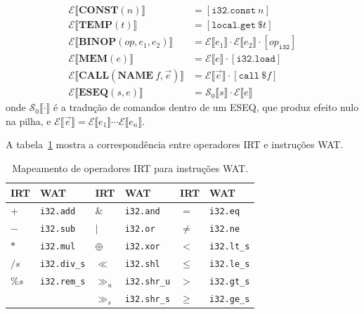 \begin{Definition}\label{def:trans-exprs}
  \begin{align*}
    \mathcal{E}\llbracket \mathbf{CONST}(n) \rrbracket
    &= [\mathtt{i32.const}\ n] \\
    \mathcal{E}\llbracket \mathbf{TEMP}(t) \rrbracket
    &= [\mathtt{local.get}\ \$t] \\
    \mathcal{E}\llbracket \mathbf{BINOP}(\mathit{op}, e_1, e_2) \rrbracket
    &= \mathcal{E}\llbracket e_1 \rrbracket \cdot
    \mathcal{E}\llbracket e_2 \rrbracket \cdot [\mathit{op}_{\mathtt{i32}}] \\
    \mathcal{E}\llbracket \mathbf{MEM}(e) \rrbracket
    &= \mathcal{E}\llbracket e \rrbracket \cdot [\mathtt{i32.load}] \\
    \mathcal{E}\llbracket \mathbf{CALL}(\mathbf{NAME}\ f, \vec{e}) \rrbracket
    &= \mathcal{E}\llbracket \vec{e} \rrbracket \cdot [\mathtt{call}\ \$f] \\
    \mathcal{E}\llbracket \mathbf{ESEQ}(s, e) \rrbracket
    &= \mathcal{S}_0\llbracket s \rrbracket \cdot
    \mathcal{E}\llbracket e \rrbracket
  \end{align*}
  onde $\mathcal{S}_0\llbracket \cdot \rrbracket$ é a tradução de comandos
  dentro de um ESEQ, que produz efeito nulo na pilha, e
  $\mathcal{E}\llbracket \vec{e} \rrbracket = \mathcal{E}\llbracket
  e_1 \rrbracket \cdots \mathcal{E}\llbracket e_n \rrbracket$.
\end{Definition}

A tabela~\ref{tab:binop} mostra a correspondência entre operadores IRT e
instruções WAT.

\begin{table}[htbp]
  \centering
  \begin{tabular}{ll|ll|ll}
    \hline
    \textbf{IRT} & \textbf{WAT} & \textbf{IRT} & \textbf{WAT} &
    \textbf{IRT} & \textbf{WAT} \\
    \hline
    $+$  & \texttt{i32.add}   & \&  & \texttt{i32.and}   & $=$  &
    \texttt{i32.eq}   \\
    $-$  & \texttt{i32.sub}   & $|$ & \texttt{i32.or}    & $\neq$ &
    \texttt{i32.ne} \\
    $*$  & \texttt{i32.mul}   & $\oplus$ & \texttt{i32.xor} & $<$ &
    \texttt{i32.lt\_s} \\
    $/s$ & \texttt{i32.div\_s}& $\ll$ & \texttt{i32.shl} & $\leq$ &
    \texttt{i32.le\_s} \\
    $\%s$& \texttt{i32.rem\_s}& $\gg_u$ & \texttt{i32.shr\_u} & $>$ &
    \texttt{i32.gt\_s} \\
    &                    & $\gg_s$ & \texttt{i32.shr\_s} & $\geq$ &
    \texttt{i32.ge\_s} \\
    \hline
  \end{tabular}
  \caption{Mapeamento de operadores IRT para instruções WAT.}\label{tab:binop}
\end{table}

